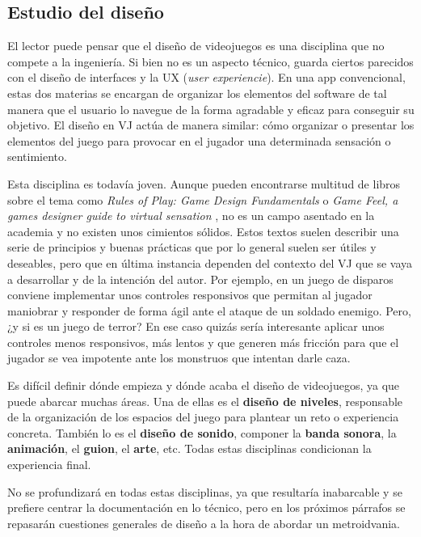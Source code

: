 \subsection{Estudio del diseño}

El lector puede pensar que el diseño de videojuegos es una disciplina que no compete a la ingeniería. Si bien no es un aspecto técnico, guarda ciertos parecidos con el diseño de interfaces y la UX (\textit{user experiencie}). En una app convencional, estas dos materias se encargan de organizar los elementos del software de tal manera que el usuario lo navegue de la forma agradable y eficaz para conseguir su objetivo. El diseño en VJ actúa de manera similar: cómo organizar o presentar los elementos del juego para provocar en el jugador una determinada sensación o sentimiento.

Esta disciplina es todavía joven. Aunque pueden encontrarse multitud de libros sobre el tema como \textit{Rules of Play: Game Design Fundamentals} \cite{rules-of-play} o \textit{Game Feel, a games designer guide to virtual sensation} \cite{gamefeel}, no es un campo asentado en la academia y no existen unos cimientos sólidos. Estos textos suelen describir una serie de principios y buenas prácticas que por lo general suelen ser útiles y deseables, pero que en última instancia dependen del contexto del VJ que se vaya a desarrollar y de la intención del autor. Por ejemplo, en un juego de disparos conviene implementar unos controles responsivos que permitan al jugador maniobrar y responder de forma ágil ante el ataque de un soldado enemigo. Pero, ¿y si es un juego de terror? En ese caso quizás sería interesante aplicar unos controles menos responsivos, más lentos y que generen más fricción para que el jugador se vea impotente ante los monstruos que intentan darle caza.

Es difícil definir dónde empieza y dónde acaba el diseño de videojuegos, ya que puede abarcar muchas áreas. Una de ellas es el \textbf{diseño de niveles}, responsable de la organización de los espacios del juego para plantear un reto o experiencia concreta. También lo es el \textbf{diseño de sonido}, componer la \textbf{banda sonora}, la \textbf{animación}, el \textbf{guion}, el \textbf{arte}, etc. Todas estas disciplinas condicionan la experiencia final. 

No se profundizará en todas estas disciplinas, ya que resultaría inabarcable y se prefiere centrar la documentación en lo técnico, pero en los próximos párrafos se repasarán cuestiones generales de diseño a la hora de abordar un metroidvania.

